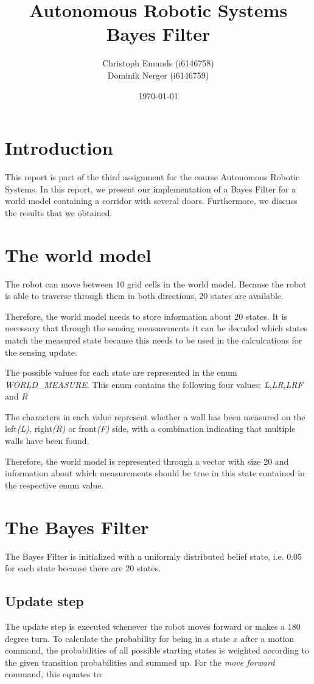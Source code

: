\documentclass[10pt,a4paper]{article}
\author{Christoph Emunds (i6146758)\\Dominik Nerger (i6146759)}
\title{Autonomous Robotic Systems\\Bayes Filter}
\date{\today}
\begin{document}
	\maketitle
	
	\tableofcontents
	
	\section{Introduction}
	This report is part of the third assignment for the course Autonomous Robotic Systems. In this report, we present our implementation of a Bayes Filter for a world model containing a corridor with several doors. Furthermore, we discuss the results that we obtained.	
		
	
	\section{The world model}
 The robot can move between 10 grid cells in the world model. Because the robot is able to traverse through them in both directions, 20 states are available.	
	
	Therefore, the world model needs to store information about 20 states. It is necessary that through the sensing measurements it can be decuded which states match the measured state because this needs to be used in the calculcations for the sensing update.
	
	The possible values for each state are represented in the enum \textit{WORLD\_MEASURE}. This enum contains the following four values: \textit{L},\textit{LR},\textit{LRF} and \textit{R}
	
	The characters in each value represent whether a wall has been measured on the left\textit{(L)}, right\textit{(R)} or front\textit{(F)} side, with a combination indicating that multiple walls have been found.
	
	Therefore, the world model is represented through a vector with size 20 and information about which measurements should be true in this state contained in the respective enum value.
	\section{The Bayes Filter}
	The Bayes Filter is initialized with a uniformly distributed belief state, i.e. 0.05 for each state because there are 20 states.
	
		\subsection{Update step}
		The update step is executed whenever the robot moves forward or makes a 180 degree turn.
		To calculate the probability for being in a state $x$ after a motion command, the probabilities of all possible starting states is weighted according to the given transition probabilities and summed up. For the \textit{move forward} command, this equates to:
		
\end{document}
